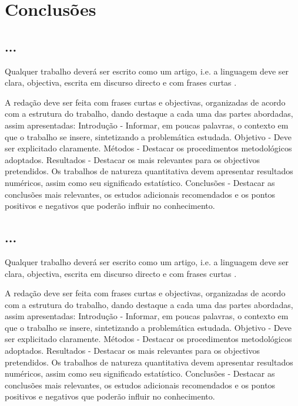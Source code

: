 % 
%  
%
\chapter{Conclusões}
\label{cha:Conclusion}

\section{...}
Qualquer trabalho deverá ser escrito como um artigo, i.e. a linguagem deve ser clara, objectiva, escrita em discurso directo e com frases curtas \cite{gustavii2016write, glasman2010science}.

A redação deve ser feita com frases curtas e objectivas, organizadas de acordo com a estrutura do trabalho, dando destaque a cada uma das partes abordadas, assim apresentadas: Introdução - Informar, em poucas palavras, o contexto em que o trabalho se insere, sintetizando a problemática estudada. Objetivo - Deve ser explicitado claramente. Métodos - Destacar os procedimentos metodológicos adoptados. Resultados - Destacar os mais relevantes para os objectivos pretendidos. Os trabalhos de natureza quantitativa devem apresentar resultados numéricos, assim como seu significado estatístico. Conclusões - Destacar as conclusões mais relevantes, os estudos adicionais recomendados e os pontos positivos e negativos que poderão influir no conhecimento. 


\section{...}
Qualquer trabalho deverá ser escrito como um artigo, i.e. a linguagem deve ser clara, objectiva, escrita em discurso directo e com frases curtas \cite{gustavii2016write, glasman2010science}.

A redação deve ser feita com frases curtas e objectivas, organizadas de acordo com a estrutura do trabalho, dando destaque a cada uma das partes abordadas, assim apresentadas: Introdução - Informar, em poucas palavras, o contexto em que o trabalho se insere, sintetizando a problemática estudada. Objetivo - Deve ser explicitado claramente. Métodos - Destacar os procedimentos metodológicos adoptados. Resultados - Destacar os mais relevantes para os objectivos pretendidos. Os trabalhos de natureza quantitativa devem apresentar resultados numéricos, assim como seu significado estatístico. Conclusões - Destacar as conclusões mais relevantes, os estudos adicionais recomendados e os pontos positivos e negativos que poderão influir no conhecimento.

